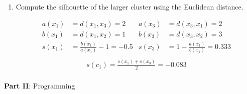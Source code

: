 \documentclass{article}
\begin{document}
\begin{enumerate}[leftmargin=\labelsep]
\begin{enumerate}
\item Compute the silhouette of the larger cluster using the Euclidean distance.

\begin{align*}
  a(x_1) &= d(x_1,x_3) = 2 & a(x_3) &= d(x_3,x_1) = 2 \\
  b(x_1) &= d(x_1,x_2) = 1 & b(x_3) &= d(x_3,x_2) = 3 \\
  s(x_1) &= \frac{b(x_1)}{a(x_1)} - 1 = -0.5 & s(x_3) &= 1 - \frac{a(x_1)}{b(x_1)} = 0.333 \\
\end{align*}
\vspace{-1cm}
\begin{align*}
  s(c_1) = \frac{s(x_1) + s(x_3)}{2} = -0.083 \\
\end{align*}

\end{enumerate}


\end{enumerate}

\large{\textbf{Part II}: Programming}\normalsize
\end{document}
